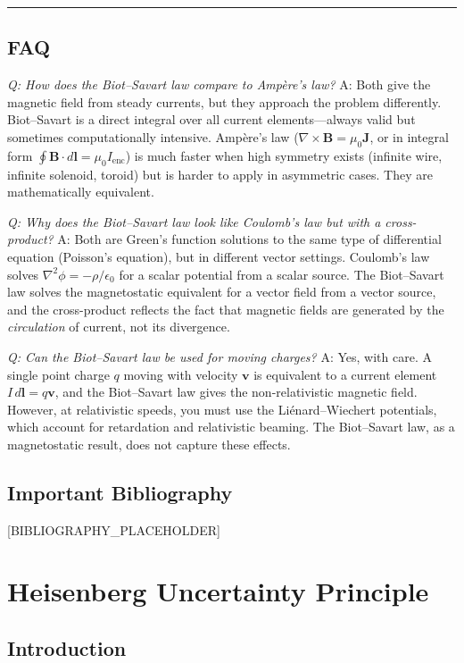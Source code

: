 \documentclass[11pt,openright]{book}
\begin{document}
\bigskip
\hrule
\bigskip
\section*{FAQ}

\textit{Q: How does the Biot--Savart law compare to Ampère's law?}
A: Both give the magnetic field from steady currents, but they approach the problem differently. Biot--Savart is a direct integral over all current elements---always valid but sometimes computationally intensive. Ampère's law ($\nabla\times\mathbf{B} = \mu_0\mathbf{J}$, or in integral form $\oint\mathbf{B}\cdot d\mathbf{l} = \mu_0 I_{\text{enc}}$) is much faster when high symmetry exists (infinite wire, infinite solenoid, toroid) but is harder to apply in asymmetric cases. They are mathematically equivalent.

\textit{Q: Why does the Biot--Savart law look like Coulomb's law but with a cross-product?}
A: Both are Green's function solutions to the same type of differential equation (Poisson's equation), but in different vector settings. Coulomb's law solves $\nabla^2\phi = -\rho/\epsilon_0$ for a scalar potential from a scalar source. The Biot--Savart law solves the magnetostatic equivalent for a vector field from a vector source, and the cross-product reflects the fact that magnetic fields are generated by the \emph{circulation} of current, not its divergence.

\textit{Q: Can the Biot--Savart law be used for moving charges?}
A: Yes, with care. A single point charge $q$ moving with velocity $\mathbf{v}$ is equivalent to a current element $I\,d\mathbf{l} = q\mathbf{v}$, and the Biot--Savart law gives the non-relativistic magnetic field. However, at relativistic speeds, you must use the Liénard--Wiechert potentials, which account for retardation and relativistic beaming. The Biot--Savart law, as a magnetostatic result, does not capture these effects.
\section*{Important Bibliography}

[BIBLIOGRAPHY_PLACEHOLDER]


\chapter{Heisenberg Uncertainty Principle}

\section*{Introduction}
\end{document}
